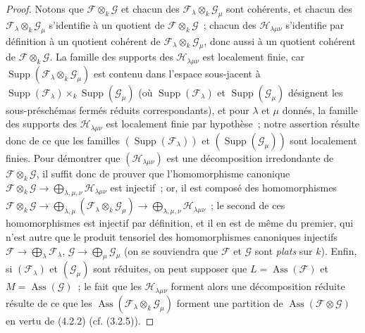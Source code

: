 \begin{proof}
Notons que $\mathcal F\otimes_k\mathcal G$ et chacun des
$\mathcal F_\lambda\otimes_k\mathcal G_\mu$ sont cohérents, et chacun des
$\mathcal F_\lambda\otimes_k\mathcal G_\mu$ s'identifie à un quotient de
$\mathcal F\otimes_k\mathcal G$~; chacun des $\mathcal H_{\lambda\mu\nu}$
s'identifie par définition à un quotient cohérent de
$\mathcal F_\lambda\otimes_k\mathcal G_\mu$, donc aussi à un quotient
cohérent de $\mathcal F\otimes_k\mathcal G$. La famille des supports des
$\mathcal H_{\lambda\mu\nu}$ est localement finie, car
$\operatorname{Supp}(\mathcal F_\lambda\otimes_k\mathcal G_\mu)$ est contenu
dans l'espace sous-jacent à
$\operatorname{Supp}(\mathcal F_\lambda)\times_k
\operatorname{Supp}(\mathcal G_\mu)$ (où
$\operatorname{Supp}(\mathcal F_\lambda)$ et
$\operatorname{Supp}(\mathcal G_\mu)$ désignent les sous-préschémas fermés
réduits correspondants), et pour $\lambda$ et $\mu$ donnés, la famille des
supports des $\mathcal H_{\lambda\mu\nu}$ est localement finie par hypothèse~;
notre assertion résulte donc de ce que les familles
$(\operatorname{Supp}(\mathcal F_\lambda))$ et
$(\operatorname{Supp}(\mathcal G_\mu))$ sont localement finies. Pour démontrer
que $(\mathcal H_{\lambda\mu\nu})$ est une décomposition irredondante de
$\mathcal F\otimes_k\mathcal G$, il suffit donc de prouver que
l'homomorphisme canonique
$\mathcal F\otimes_k\mathcal G
\longrightarrow\bigoplus_{\lambda,\mu,\nu}\mathcal H_{\lambda\mu\nu}$
est injectif~; or, il est composé des homomorphismes
$\mathcal F\otimes_k\mathcal G
\longrightarrow\bigoplus_{\lambda,\mu}(\mathcal F_\lambda\otimes_k\mathcal G_\mu)
\longrightarrow\bigoplus_{\lambda,\mu,\nu}\mathcal H_{\lambda\mu\nu}$~;
le second de ces homomorphismes est injectif par définition, et il en est de
même du premier, qui n'est autre que le produit tensoriel des homomorphismes
canoniques injectifs
$\mathcal F\to\bigoplus_\lambda\mathcal F_\lambda$,
$\mathcal G\to\bigoplus_\mu\mathcal G_\mu$ (on se souviendra que
$\mathcal F$ et $\mathcal G$ sont \emph{plats} sur $k$). Enfin, si
$(\mathcal F_\lambda)$ et $(\mathcal G_\mu)$ sont réduites, on peut supposer
que $L=\operatorname{Ass}(\mathcal F)$ et
$M=\operatorname{Ass}(\mathcal G)$~; le fait que les
$\mathcal H_{\lambda\mu\nu}$ forment alors une décomposition réduite résulte
de ce que les $\operatorname{Ass}(\mathcal F_\lambda\otimes_k
\mathcal G_\mu)$ forment une partition de
$\operatorname{Ass}(\mathcal F\otimes\mathcal G)$ en vertu de (4.2.2)
(cf. (3.2.5)).
\end{proof}


